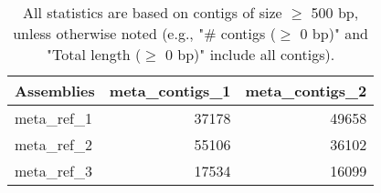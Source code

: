 \documentclass[12pt,a4paper]{article}
\begin{document}
\begin{table}[ht]
\begin{center}
\caption{All statistics are based on contigs of size $\geq$ 500 bp, unless otherwise noted (e.g., "\# contigs ($\geq$ 0 bp)" and "Total length ($\geq$ 0 bp)" include all contigs).}
\begin{tabular}{|l*{2}{|r}|}
\hline
Assemblies & meta\_contigs\_1 & meta\_contigs\_2 \\ \hline
meta\_ref\_1 & 37178 & 49658 \\ \hline
meta\_ref\_2 & 55106 & 36102 \\ \hline
meta\_ref\_3 & 17534 & 16099 \\ \hline
\end{tabular}
\end{center}
\end{table}
\end{document}
